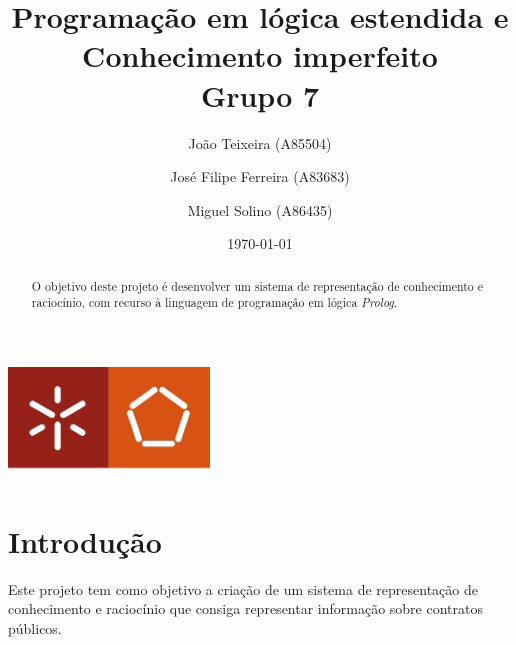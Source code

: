 \documentclass[a4paper]{report}
\begin{document}
\title{Programação em lógica estendida e Conhecimento imperfeito \\
\large Grupo 7}
\author{João Teixeira (A85504) \and José Filipe Ferreira (A83683) \and Miguel
Solino (A86435)}
\date{\today}

\begin{center}
    \begin{minipage}{0.75\linewidth}
        \centering
        \includegraphics[width=0.4\textwidth]{eng.jpeg}\par\vspace{1cm}
        \vspace{1.5cm}
        \href{https://www.uminho.pt/PT}
        {\color{black}{\scshape\LARGE Universidade do Minho}} \par
        \vspace{1cm}
        \href{https://www.di.uminho.pt/}
        {\color{black}{\scshape\Large Departamento de Informática}} \par
        \vspace{1.5cm}
        \maketitle
    \end{minipage}
\end{center}

\begin{abstract}
    \begin{center}
        O objetivo deste projeto é desenvolver um sistema de representação de
        conhecimento e raciocínio, com recurso à linguagem de programação em
        lógica \textit{Prolog}.
    \end{center}
\end{abstract}

\tableofcontents

\pagebreak

\chapter{Introdução}
Este projeto tem como objetivo a criação de um sistema de representação de
conhecimento e raciocínio que consiga representar informação sobre contratos
públicos.
\end{document}
